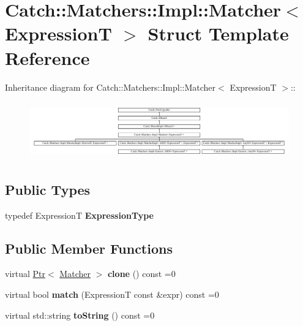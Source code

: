 \hypertarget{structCatch_1_1Matchers_1_1Impl_1_1Matcher}{
\section{Catch::Matchers::Impl::Matcher$<$ ExpressionT $>$ Struct Template Reference}
\label{structCatch_1_1Matchers_1_1Impl_1_1Matcher}
}
Inheritance diagram for Catch::Matchers::Impl::Matcher$<$ ExpressionT $>$::\begin{figure}[H]
\begin{center}
\leavevmode
\includegraphics[height=2.50559cm]{structCatch_1_1Matchers_1_1Impl_1_1Matcher}
\end{center}
\end{figure}
\subsection*{Public Types}
\begin{DoxyCompactItemize}
\item 
\hypertarget{structCatch_1_1Matchers_1_1Impl_1_1Matcher_a7f5068cbacd1eed06cf243e63446e7e1}{
typedef ExpressionT {\bfseries ExpressionType}}
\label{structCatch_1_1Matchers_1_1Impl_1_1Matcher_a7f5068cbacd1eed06cf243e63446e7e1}

\end{DoxyCompactItemize}
\subsection*{Public Member Functions}
\begin{DoxyCompactItemize}
\item 
\hypertarget{structCatch_1_1Matchers_1_1Impl_1_1Matcher_a9d31e5018fea24efa08c3cbf5aa4475d}{
virtual \hyperlink{classCatch_1_1Ptr}{Ptr}$<$ \hyperlink{structCatch_1_1Matchers_1_1Impl_1_1Matcher}{Matcher} $>$ {\bfseries clone} () const =0}
\label{structCatch_1_1Matchers_1_1Impl_1_1Matcher_a9d31e5018fea24efa08c3cbf5aa4475d}

\item 
\hypertarget{structCatch_1_1Matchers_1_1Impl_1_1Matcher_a8c1c5511ce1f3738a45e6901b558f583}{
virtual bool {\bfseries match} (ExpressionT const \&expr) const =0}
\label{structCatch_1_1Matchers_1_1Impl_1_1Matcher_a8c1c5511ce1f3738a45e6901b558f583}

\item 
\hypertarget{structCatch_1_1Matchers_1_1Impl_1_1Matcher_a091bcc37e589967d7e10fc7790d820e2}{
virtual std::string {\bfseries toString} () const =0}
\label{structCatch_1_1Matchers_1_1Impl_1_1Matcher_a091bcc37e589967d7e10fc7790d820e2}

\end{DoxyCompactItemize}
